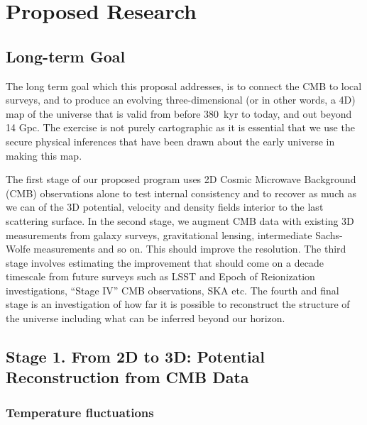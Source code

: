 \documentclass[psfig,11pt]{article}
\begin{document}


\section{Proposed Research}

\subsection{Long-term Goal}

The long term goal which this proposal addresses, is to connect the CMB to local surveys, and to produce an evolving three-dimensional (or in other words, a 4D) map of the universe that is valid from before 380~kyr to today, and out beyond 14 Gpc. The exercise is not purely cartographic as it is essential that we use the secure physical inferences that have been drawn about the early universe in making this map.

The first stage of our proposed program uses 2D Cosmic Microwave Background (CMB) observations alone to test internal consistency and to recover as much as we can of the 3D potential, velocity and density fields interior to the last scattering surface. In the second stage, we augment CMB data with existing 3D measurements from galaxy surveys, gravitational lensing, intermediate Sachs-Wolfe measurements and so on. This should improve the resolution. The third stage involves estimating the improvement that should come on a decade timescale from future surveys such as LSST and Epoch of Reionization investigations, ``Stage IV'' CMB observations, SKA etc. The fourth and final stage is an investigation of how far it is possible to reconstruct the structure of the universe including what can be inferred beyond our horizon.


\subsection{Stage 1. From 2D to 3D: Potential Reconstruction from CMB Data}

\subsubsection{Temperature fluctuations}
\end{document}
